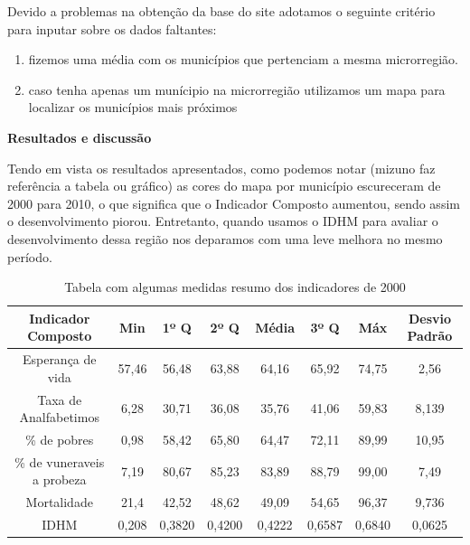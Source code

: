 \documentclass[11pt,a4paper]{article}
\begin{document}
Devido a problemas na obtenção da base do site \cite{atlas} adotamos o seguinte critério para inputar sobre os dados faltantes:
\begin{enumerate}[label=(\roman*)]
\item fizemos uma média com os municípios que pertenciam a mesma microrregião. 
\item caso tenha apenas um munícipio na microrregião utilizamos um mapa para localizar os municípios mais próximos
\end{enumerate}

\textbf{Resultados e discussão}

Tendo em vista os resultados apresentados, como podemos notar (mizuno faz referência a tabela ou gráfico) as cores do mapa por município escureceram de 2000 para 2010, o que significa que o Indicador Composto aumentou, sendo assim o desenvolvimento piorou. Entretanto, quando usamos o IDHM para avaliar o desenvolvimento dessa região nos deparamos com uma leve melhora no mesmo período.

\begin{table}[h!]
  \begin{center}
      \caption{Tabela com algumas medidas resumo dos indicadores de 2000}
    \begin{tabular}{c|c|c|c|c|c|c|c}
    \hline
      \textbf{Indicador Composto} & \textbf{Min} & \textbf{1º Q} & \textbf{2º Q} & \textbf{Média} & \textbf{3º Q} & \textbf{Máx}  & \textbf{Desvio Padrão} \\
      \hline
      Esperança de vida & 57,46 & 56,48 & 63,88 & 64,16 & 65,92 & 74,75 & 2,56\\
      Taxa de Analfabetimos & 6,28 & 30,71 & 36,08 & 35,76 & 41,06 & 59,83 & 8,139\\
      \% de pobres & 0,98 & 58,42 & 65,80 & 64,47 & 72,11 & 89,99 & 10,95\\ 
      \% de vuneraveis a probeza & 7,19 & 80,67 & 85,23 & 83,89 & 88,79 & 99,00 & 7,49 \\ 
      Mortalidade & 21,4 & 42,52 & 48,62 & 49,09 & 54,65 & 96,37 &  9,736\\ 
      IDHM & 0,208 & 0,3820 & 0,4200 & 0,4222 & 0,6587 & 0,6840 & 0,0625 \\
      \hline
    \end{tabular}
     \label{table:1}
  \end{center}
\end{table}
\end{document}
